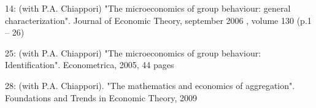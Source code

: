 14: (with P.A. Chiappori) "The microeconomics of group behaviour: general characterization". Journal of Economic Theory, september 2006 , volume 130 (p.1 – 26)

25: (with P.A. Chiappori) "The microeconomics of group behaviour: Identification". Econometrica, 2005, 44 pages

28: (with P.A. Chiappori). "The mathematics and economics of aggregation". Foundations and Trends in Economic Theory, 2009
